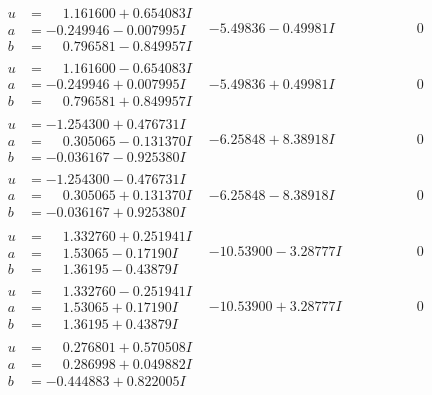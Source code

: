 \documentclass[1p]{elsarticle_modified}
\theoremstyle{definition}
\begin{document}
$$\begin{array}{c|c|c}
\begin{aligned}
u &= \phantom{-}1.161600 + 0.654083 I \\
a &= -0.249946 - 0.007995 I \\
b &= \phantom{-}0.796581 - 0.849957 I\end{aligned}
 & -5.49836 - 0.49981 I & \phantom{-0.000000 } 0 \\ \hline\begin{aligned}
u &= \phantom{-}1.161600 - 0.654083 I \\
a &= -0.249946 + 0.007995 I \\
b &= \phantom{-}0.796581 + 0.849957 I\end{aligned}
 & -5.49836 + 0.49981 I & \phantom{-0.000000 } 0 \\ \hline\begin{aligned}
u &= -1.254300 + 0.476731 I \\
a &= \phantom{-}0.305065 - 0.131370 I \\
b &= -0.036167 - 0.925380 I\end{aligned}
 & -6.25848 + 8.38918 I & \phantom{-0.000000 } 0 \\ \hline\begin{aligned}
u &= -1.254300 - 0.476731 I \\
a &= \phantom{-}0.305065 + 0.131370 I \\
b &= -0.036167 + 0.925380 I\end{aligned}
 & -6.25848 - 8.38918 I & \phantom{-0.000000 } 0 \\ \hline\begin{aligned}
u &= \phantom{-}1.332760 + 0.251941 I \\
a &= \phantom{-}1.53065 - 0.17190 I \\
b &= \phantom{-}1.36195 - 0.43879 I\end{aligned}
 & -10.53900 - 3.28777 I & \phantom{-0.000000 } 0 \\ \hline\begin{aligned}
u &= \phantom{-}1.332760 - 0.251941 I \\
a &= \phantom{-}1.53065 + 0.17190 I \\
b &= \phantom{-}1.36195 + 0.43879 I\end{aligned}
 & -10.53900 + 3.28777 I & \phantom{-0.000000 } 0 \\ \hline\begin{aligned}
u &= \phantom{-}0.276801 + 0.570508 I \\
a &= \phantom{-}0.286998 + 0.049882 I \\
b &= -0.444883 + 0.822005 I\end{aligned}

\end{array}$$
\end{document}
